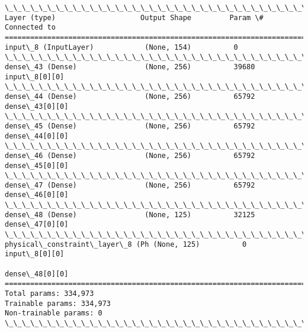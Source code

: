 \documentclass[11pt]{article}
\begin{document}
    \begin{Verbatim}[commandchars=\\\{\}]
\_\_\_\_\_\_\_\_\_\_\_\_\_\_\_\_\_\_\_\_\_\_\_\_\_\_\_\_\_\_\_\_\_\_\_\_\_\_\_\_\_\_\_\_\_\_\_\_\_\_\_\_\_\_\_\_\_\_\_\_\_\_\_\_\_\_\_\_\_\_\_\_\_\_\_\_\_\_\_\_\_\_\_\_\_\_\_\_\_\_\_\_\_\_\_\_\_\_
Layer (type)                    Output Shape         Param \#     Connected to                     
==================================================================================================
input\_8 (InputLayer)            (None, 154)          0                                            
\_\_\_\_\_\_\_\_\_\_\_\_\_\_\_\_\_\_\_\_\_\_\_\_\_\_\_\_\_\_\_\_\_\_\_\_\_\_\_\_\_\_\_\_\_\_\_\_\_\_\_\_\_\_\_\_\_\_\_\_\_\_\_\_\_\_\_\_\_\_\_\_\_\_\_\_\_\_\_\_\_\_\_\_\_\_\_\_\_\_\_\_\_\_\_\_\_\_
dense\_43 (Dense)                (None, 256)          39680       input\_8[0][0]                    
\_\_\_\_\_\_\_\_\_\_\_\_\_\_\_\_\_\_\_\_\_\_\_\_\_\_\_\_\_\_\_\_\_\_\_\_\_\_\_\_\_\_\_\_\_\_\_\_\_\_\_\_\_\_\_\_\_\_\_\_\_\_\_\_\_\_\_\_\_\_\_\_\_\_\_\_\_\_\_\_\_\_\_\_\_\_\_\_\_\_\_\_\_\_\_\_\_\_
dense\_44 (Dense)                (None, 256)          65792       dense\_43[0][0]                   
\_\_\_\_\_\_\_\_\_\_\_\_\_\_\_\_\_\_\_\_\_\_\_\_\_\_\_\_\_\_\_\_\_\_\_\_\_\_\_\_\_\_\_\_\_\_\_\_\_\_\_\_\_\_\_\_\_\_\_\_\_\_\_\_\_\_\_\_\_\_\_\_\_\_\_\_\_\_\_\_\_\_\_\_\_\_\_\_\_\_\_\_\_\_\_\_\_\_
dense\_45 (Dense)                (None, 256)          65792       dense\_44[0][0]                   
\_\_\_\_\_\_\_\_\_\_\_\_\_\_\_\_\_\_\_\_\_\_\_\_\_\_\_\_\_\_\_\_\_\_\_\_\_\_\_\_\_\_\_\_\_\_\_\_\_\_\_\_\_\_\_\_\_\_\_\_\_\_\_\_\_\_\_\_\_\_\_\_\_\_\_\_\_\_\_\_\_\_\_\_\_\_\_\_\_\_\_\_\_\_\_\_\_\_
dense\_46 (Dense)                (None, 256)          65792       dense\_45[0][0]                   
\_\_\_\_\_\_\_\_\_\_\_\_\_\_\_\_\_\_\_\_\_\_\_\_\_\_\_\_\_\_\_\_\_\_\_\_\_\_\_\_\_\_\_\_\_\_\_\_\_\_\_\_\_\_\_\_\_\_\_\_\_\_\_\_\_\_\_\_\_\_\_\_\_\_\_\_\_\_\_\_\_\_\_\_\_\_\_\_\_\_\_\_\_\_\_\_\_\_
dense\_47 (Dense)                (None, 256)          65792       dense\_46[0][0]                   
\_\_\_\_\_\_\_\_\_\_\_\_\_\_\_\_\_\_\_\_\_\_\_\_\_\_\_\_\_\_\_\_\_\_\_\_\_\_\_\_\_\_\_\_\_\_\_\_\_\_\_\_\_\_\_\_\_\_\_\_\_\_\_\_\_\_\_\_\_\_\_\_\_\_\_\_\_\_\_\_\_\_\_\_\_\_\_\_\_\_\_\_\_\_\_\_\_\_
dense\_48 (Dense)                (None, 125)          32125       dense\_47[0][0]                   
\_\_\_\_\_\_\_\_\_\_\_\_\_\_\_\_\_\_\_\_\_\_\_\_\_\_\_\_\_\_\_\_\_\_\_\_\_\_\_\_\_\_\_\_\_\_\_\_\_\_\_\_\_\_\_\_\_\_\_\_\_\_\_\_\_\_\_\_\_\_\_\_\_\_\_\_\_\_\_\_\_\_\_\_\_\_\_\_\_\_\_\_\_\_\_\_\_\_
physical\_constraint\_layer\_8 (Ph (None, 125)          0           input\_8[0][0]                    
                                                                 dense\_48[0][0]                   
==================================================================================================
Total params: 334,973
Trainable params: 334,973
Non-trainable params: 0
\_\_\_\_\_\_\_\_\_\_\_\_\_\_\_\_\_\_\_\_\_\_\_\_\_\_\_\_\_\_\_\_\_\_\_\_\_\_\_\_\_\_\_\_\_\_\_\_\_\_\_\_\_\_\_\_\_\_\_\_\_\_\_\_\_\_\_\_\_\_\_\_\_\_\_\_\_\_\_\_\_\_\_\_\_\_\_\_\_\_\_\_\_\_\_\_\_\_

    \end{Verbatim}
\end{document}
